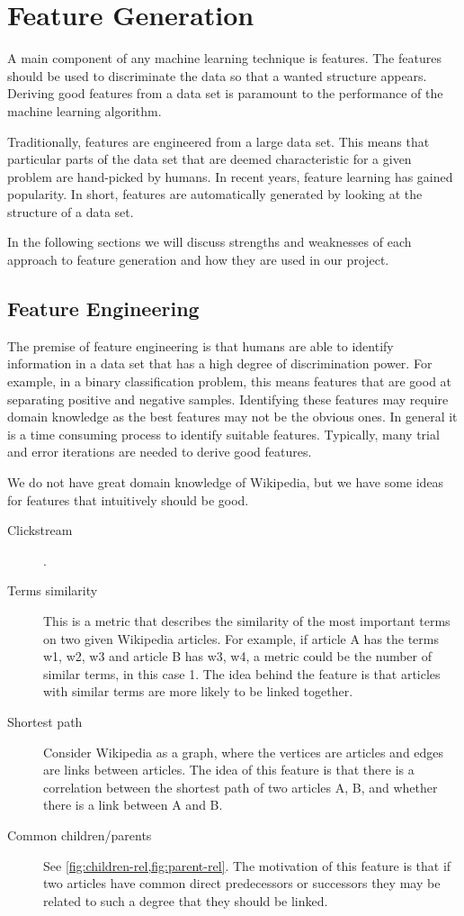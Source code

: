 \section{Feature Generation}\label{sec:feature_generation}
A main component of any machine learning technique is features. The features should be used to discriminate the data so that a wanted structure appears. Deriving good features from a data set is paramount to the performance of the machine learning algorithm.

Traditionally, features are engineered from a large data set. This means that particular parts of the data set that are deemed characteristic for a given problem are hand-picked by humans. In recent years, feature learning has gained popularity. In short, features are automatically generated by looking at the structure of a data set.

In the following sections we will discuss strengths and weaknesses of each approach to feature generation and how they are used in our project.

\subsection{Feature Engineering}
The premise of feature engineering is that humans are able to identify information in a data set that has a high degree of discrimination power. For example, in a binary classification problem, this means features that are good at separating positive and negative samples. Identifying these features may require domain knowledge as the best features may not be the obvious ones. In general it is a time consuming process to identify suitable features. Typically, many trial and error iterations are needed to derive good features.

We do not have great domain knowledge of Wikipedia, but we have some ideas for features that intuitively should be good.

\begin{description}
    \item[Clickstream] .
    \item[Terms similarity] This is a metric that describes the similarity of the most important terms on two given Wikipedia articles. For example, if article A has the terms w1, w2, w3 and article B has w3, w4, a metric could be the number of similar terms, in this case 1. The idea behind the feature is that articles with similar terms are more likely to be linked together.
    \item[Shortest path] Consider Wikipedia as a graph, where the vertices are articles and edges are links between articles. The idea of this feature is that there is a correlation between the shortest path of two articles A, B, and whether there is a link between A and B. 
    \item[Common children/parents] See \cref{fig:children-rel,fig:parent-rel}. The motivation of this feature is that if two articles have common direct predecessors or successors they may be related to such a degree that they should be linked. 
\end{description}


